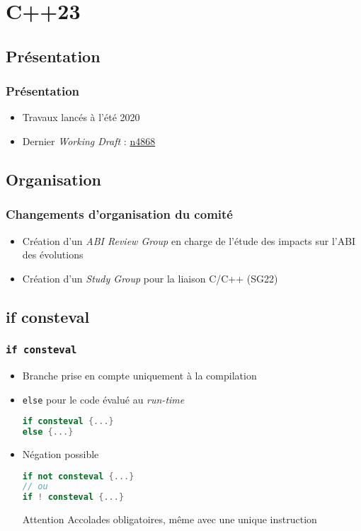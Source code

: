 \documentclass[C++.tex]{subfiles}
\begin{document}
\section{C++23}
\subsection*{Présentation}
\begin{frame}
	\frametitle{Présentation}
	\begin{itemize}
		\item Travaux lancés à l'été 2020
		\item Dernier \textit{Working Draft} : \href{https://github.com/cplusplus/draft/releases/download/n4868/n4868.pdf}{n4868}
	\end{itemize}
\end{frame}

\subsection*{Organisation}
\begin{frame}
	\frametitle{Changements d'organisation du comité}
	\begin{itemize}
		\item Création d'un \textit{ABI Review Group} en charge de l'étude des impacts sur l'ABI des évolutions
		\item Création d'un \textit{Study Group} pour la liaison C/C++ (SG22)
	\end{itemize}
\end{frame}

\subsection*{if consteval}
\begin{frame}[fragile]
	\frametitle{\lstinline|if consteval|}
	\begin{itemize}
		\item Branche prise en compte uniquement à la compilation
		\item \lstinline|else| pour le code évalué au \textit{run-time}

		\begin{lstlisting}[language=C++]
if consteval {...}
else {...}\end{lstlisting}

		\item Négation possible

		\begin{lstlisting}[language=C++]
if not consteval {...}
// ou
if ! consteval {...}\end{lstlisting}

		\begin{alertblock}{Attention}
			Accolades obligatoires, même avec une unique instruction
		\end{alertblock}

	\end{itemize}

\end{frame}
\end{document}
